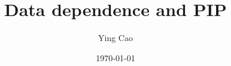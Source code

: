 \documentclass {article}
\title{Data dependence and PIP}
\author{Ying Cao}
\date{\today}
\begin{document}
\maketitle
\tableofcontents
\newpage


{
\small
\raggedright

\begin{spacing}{1}

\end{spacing}
}
\end{document}
